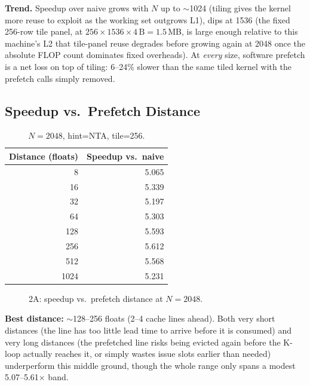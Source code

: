 \documentclass[11pt]{article}
\begin{document}
\textbf{Trend.} Speedup over naive grows with $N$ up to $\sim$1024 (tiling gives the
kernel more reuse to exploit as the working set outgrows L1), dips at 1536 (the fixed
256-row tile panel, at $256\times1536\times4\,\text{B} = 1.5$\,MB, is large enough
relative to this machine's L2 that tile-panel reuse degrades before growing again at
2048 once the absolute FLOP count dominates fixed overheads). At \emph{every} size,
software prefetch is a net loss on top of tiling: 6--24\% slower than the same tiled
kernel with the prefetch calls simply removed.

\subsection{Speedup vs.\ Prefetch Distance}

\begin{table}[h]
\centering
\begin{tabular}{r r}
\toprule
Distance (floats) & {Speedup vs.\ naive} \\
\midrule
8    & 5.065 \\
16   & 5.339 \\
32   & 5.197 \\
64   & 5.303 \\
128  & 5.593 \\
256  & 5.612 \\
512  & 5.568 \\
1024 & 5.231 \\
\bottomrule
\end{tabular}
\caption{$N{=}2048$, hint=NTA, tile=256.}
\end{table}

\begin{figure}[h]
\centering
{}
\caption{2A: speedup vs.\ prefetch distance at $N{=}2048$.}
\end{figure}

\textbf{Best distance:} $\sim$128--256 floats (2--4 cache lines ahead). Both very short
distances (the line has too little lead time to arrive before it is consumed) and very
long distances (the prefetched line risks being evicted again before the K-loop actually
reaches it, or simply wastes issue slots earlier than needed) underperform this middle
ground, though the whole range only spans a modest 5.07--5.61$\times$ band.
\end{document}
